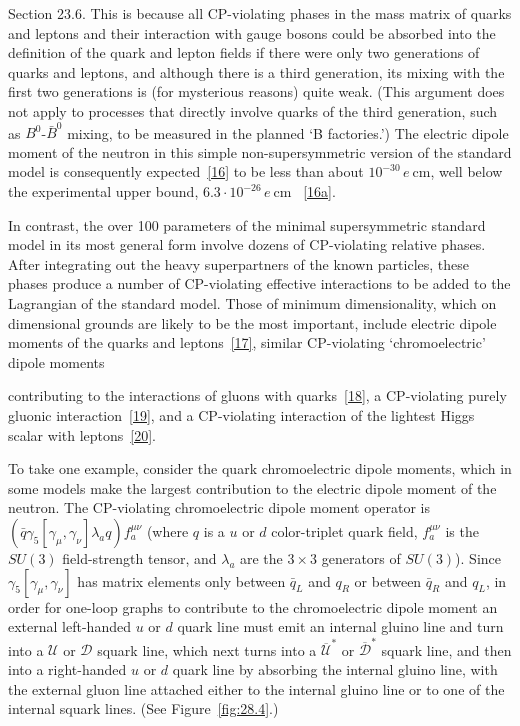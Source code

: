 \noindent
Section 23.6. This is because all CP-violating phases in the mass matrix
of quarks and leptons and their interaction with gauge bosons could be
absorbed into the definition of the quark and lepton fields if there were
only two generations of quarks and leptons, and although there is a third
generation, its mixing with the first two generations is (for mysterious
reasons) quite weak. (This argument does not apply to processes that
directly involve quarks of the third generation, such as
\(B^0\)-\(\bar B^0\) mixing, to be measured in the planned `B
factories.') The electric dipole moment of the neutron in this simple
non-supersymmetric version of the standard model is consequently
expected~\hyperref[ch28-ref-16]{[16]} to be less than about
\(10^{-30}\,e\ \mathrm{cm}\), well below the experimental upper bound,
\(6.3\mathbin{\cdot}10^{-26}\,e\ \mathrm{cm}\)
~\hyperref[ch28-ref-16a]{[16a]}.

In contrast, the over 100 parameters of the minimal supersymmetric
standard model in its most general form involve dozens of CP-violating
relative phases. After integrating out the heavy superpartners of the
known particles, these phases produce a number of CP-violating effective
interactions to be added to the Lagrangian of the standard model. Those of
minimum dimensionality, which on dimensional grounds are likely to be the
most important, include electric dipole moments of the quarks and
leptons~\hyperref[ch28-ref-17]{[17]}, similar CP-violating
`chromoelectric' dipole moments


\noindent
contributing to the interactions of gluons with
quarks~\hyperref[ch28-ref-18]{[18]}, a CP-violating purely gluonic
interaction~\hyperref[ch28-ref-19]{[19]}, and a CP-violating interaction
of the lightest Higgs scalar with leptons~\hyperref[ch28-ref-20]{[20]}.

To take one example, consider the quark chromoelectric dipole moments,
which in some models make the largest contribution to the electric dipole
moment of the neutron. The CP-violating chromoelectric dipole moment
operator is
\((\bar q\gamma_5[\gamma_\mu,\gamma_\nu]\lambda_aq)f_a^{\mu\nu}\)
(where \(q\) is a \(u\) or \(d\) color-triplet quark field,
\(f_a^{\mu\nu}\) is the \(SU(3)\) field-strength tensor, and
\(\lambda_a\) are the \(3\mathbin{\times}3\) generators of \(SU(3)\)).
Since \(\gamma_5[\gamma_\mu,\gamma_\nu]\) has matrix elements only
between \(\bar q_L\) and \(q_R\) or between \(\bar q_R\) and \(q_L\), in
order for one-loop graphs to contribute to the chromoelectric dipole
moment an external left-handed \(u\) or \(d\) quark line must emit an
internal gluino line and turn into a \(\mathcal{U}\) or \(\mathcal{D}\)
squark line, which next turns into a
\(\overline{\mathcal{U}}^*\) or \(\overline{\mathcal{D}}^*\) squark
line, and then into a right-handed \(u\) or \(d\) quark line by absorbing
the internal gluino line, with the external gluon line attached either to
the internal gluino line or to one of the internal squark lines. (See
Figure~\ref{fig:28.4}.)

